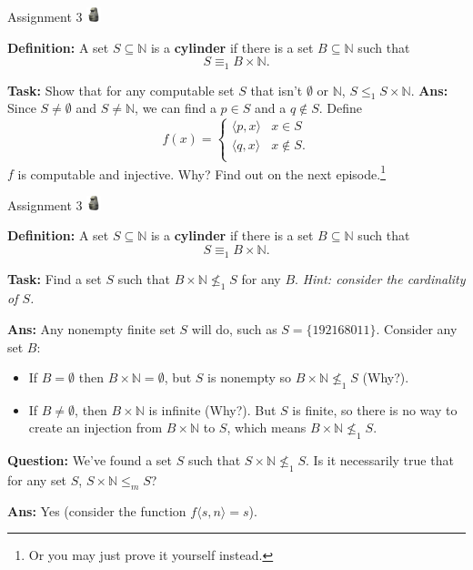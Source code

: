 \documentclass{beamer}
\newcommand{\emojimoyai}{\includegraphics[width=12pt]{img/moyai.png}}
\newcommand{\N}{{\mathbb N}}
\newcommand{\inner}[1]{\langle #1 \rangle}
\begin{document}
\begin{frame}{Assignment 3 \emojimoyai}

\textbf{Definition:} A set $S \subseteq \N$ is a \textbf{cylinder} if there is a set $B \subseteq \N$ such that
$$S \equiv_1 B \times \N.$$

\textbf{Task:} Show that for any computable set $S$ that isn't $\emptyset$ or $\N$, $S \leq_1 S \times \N$. \pause
\textbf{Ans:} Since $S \neq \emptyset$ and $S \neq \N$, we can find a $p \in S$ and a $q \notin S$. Define
$$f(x) = \begin{cases}
\inner{p, x} & x \in S\\
\inner{q, x} & x \notin S.\\
\end{cases}$$
$f$ is computable and injective. Why? Find out on the next episode.\footnote{Or you may just prove it yourself instead.}

\end{frame}

\begin{frame}{Assignment 3 \emojimoyai}

\textbf{Definition:} A set $S \subseteq \N$ is a \textbf{cylinder} if there is a set $B \subseteq \N$ such that
$$S \equiv_1 B \times \N.$$

\textbf{Task:} Find a set $S$ such that $B \times \N \not \leq_1 S$ for any $B$. \textit{Hint: consider the cardinality of $S$.}

\pause

\textbf{Ans:} Any nonempty finite set $S$ will do, such as $S = \{192168011\}$. Consider any set $B$:\pause
\begin{itemize}
    \item If $B = \emptyset$ then $B \times \N = \emptyset$, but $S$ is nonempty so $B \times \N \not \leq_1 S$ (Why?).\pause
    \item If $B \neq \emptyset$, then $B \times \N$ is infinite (Why?). But $S$ is finite, so there is no way to create an injection from $B \times \N$ to $S$, which means $B \times \N \not \leq_1 S$.
\end{itemize}
\pause
\textbf{Question:} We've found a set $S$ such that $S \times \N \not \leq_1 S$. Is it necessarily true that for any set $S$, $S \times \N \leq_m S$? \pause 

\textbf{Ans:} Yes (consider the function $f\inner{s, n} = s$).
\end{frame}
\end{document}
